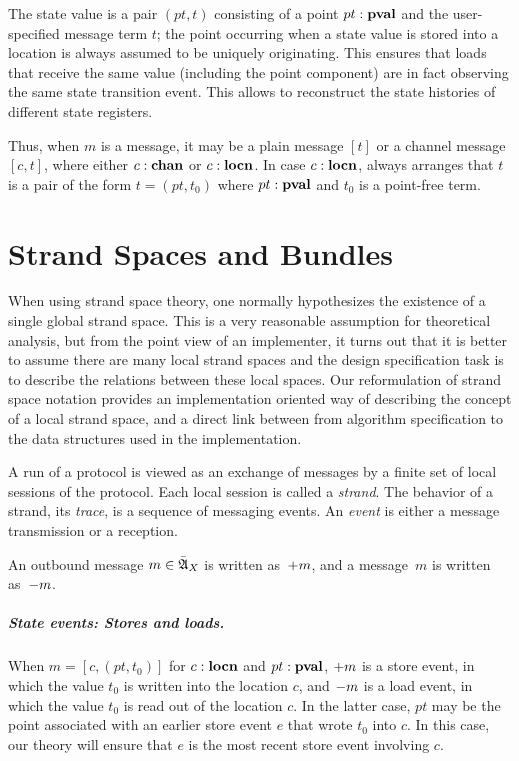 \documentclass[12pt]{report}
\theoremstyle{definition}
\newcommand{\algbara}{\bar{\alg{A}}}
\begin{document}
The state value is a pair $(pt,t)$ consisting of a point
$pt : \operatorname{\mathbf{pval}}$ and the user-specified message term $t$; the point
occurring when a state value is stored into a location is always
assumed to be uniquely originating.  This ensures that loads that
receive the same value (including the point component) are in fact
observing the same state transition event.  This allows {\cpsa} to
reconstruct the state histories of different state registers.

Thus, when $m$ is a message, it may be a plain message $[t]$ or a
channel message $[c,t]$, where either $c : \operatorname{\mathbf{chan}}$ or
$c : \operatorname{\mathbf{locn}}$.  In case $c : \operatorname{\mathbf{locn}}$, {\cpsa} always arranges
that $t$ is a pair of the form $t=(pt,t_0)$ where $pt : \operatorname{\mathbf{pval}}$
and $t_0$ is a point-free term.


\chapter{Strand Spaces and Bundles}\label{chp:strand spaces and bundles}

When using strand space theory, one normally hypothesizes the
existence of a single global strand space.  This is a very reasonable
assumption for theoretical analysis, but from the point view of an
implementer, it turns out that it is better to assume there are many
local strand spaces and the design specification task is to describe
the relations between these local spaces.  Our reformulation of strand
space notation provides an implementation oriented way of describing
the concept of a local strand space, and a direct link between from
algorithm specification to the data structures used in the
implementation.

A run of a protocol is viewed as an exchange of messages by a finite
set of local sessions of the protocol.  Each local session is called a
\emph{strand}.  The behavior of a strand, its
\emph{trace}, is a sequence of messaging events.  An
\emph{event} is either a message transmission or a
reception.

An outbound message $m\in\algbara_X$ is written as~$\mathord + m$, and a
message~$m$ is written as~$\mathord - m$.

\paragraph{State events:  Stores and loads.}  When $m=[c,(pt,t_0)]$
for $c : \operatorname{\mathbf{locn}}$ and $pt : \operatorname{\mathbf{pval}}$, $\mathord + m$ is a store
event, in which the value $t_0$ is written into the location $c$, and
$\mathord - m$ is a load event, in which the value $t_0$ is read out of
the location $c$.  In the latter case, $pt$ may be the point
associated with an earlier store event $e$ that wrote $t_0$ into $c$.
In this case, our theory will ensure that $e$ is the most recent store
event involving $c$.
\end{document}
